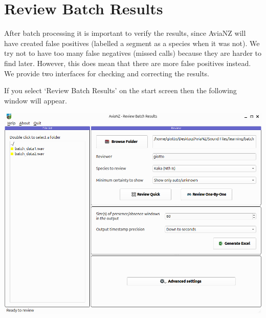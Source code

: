 \documentclass{article}
\begin{document}
\section{Review Batch Results}\label{sec:review}

After batch processing it is important to verify the results, since AviaNZ will have created false positives (labelled a segment as a species when it was not). We try not to have too many false negatives (missed calls) because they are harder to find later. However, this does mean that there are more false positives instead. We provide two interfaces for checking and correcting the results. 

If you select `Review Batch Results' on the start screen then the following window will appear.

\begin{center}
	\includegraphics[width=.95\textwidth]{Figures/BatchReview1}
\end{center}
\end{document}
